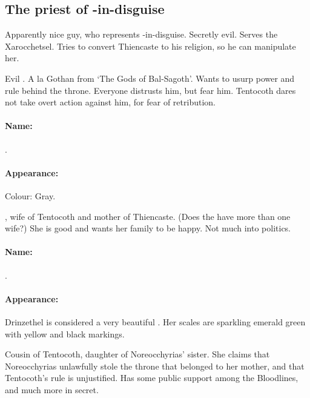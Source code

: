 \subsection{The priest of \NehranKoss-in-disguise}
Apparently nice guy, who represents \NehranKoss-in-disguise. Secretly evil. Serves the Xarocchetsel. Tries to convert Thiencaste to his religion, so he can manipulate her. 



Evil \dragon{}. A la Gothan from `The Gods of Bal-Sagoth'. Wants to usurp power and rule behind the throne. Everyone distrusts him, but fear him. Tentocoth dares not take overt action against him, for fear of \NerrhanKossz{} retribution. 

\paragraph{Name:}
.


\paragraph{Appearance:}
Colour: Gray. 



\DragonQueen, wife of Tentocoth and mother of Thiencaste. (Does the \DragonKing{} have more than one wife?) She is good and wants her family to be happy. Not much into politics. 

\paragraph{Name:}
.

\paragraph{Appearance:}
Drinzethel is considered a very beautiful \dragon. Her scales are sparkling emerald green with yellow and black markings. 



Cousin of Tentocoth, daughter of Noreocchyrias' sister. She claims that Noreocchyrias unlawfully stole the throne that belonged to her mother, and that Tentocoth's rule is unjustified. Has some public support among the Bloodlines, and much more in secret. 

